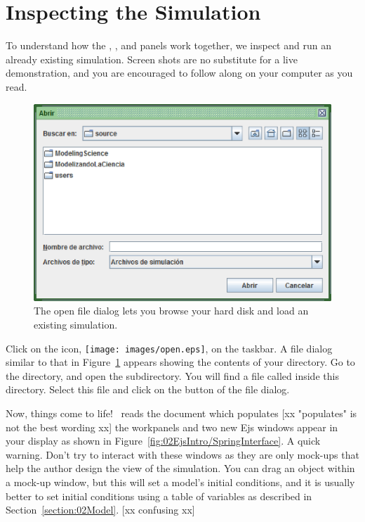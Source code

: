     \section{Inspecting the Simulation}\label{section:02Inspecting}
To understand how the , , and  panels work together, we inspect and run an
already existing simulation. Screen shots are no substitute for a live demonstration, and you are encouraged to follow along on your computer as you read.

\begin{figure}[htb]
  \centering
  \includegraphics[scale=\scale]{02EjsIntro/images/OpenDialog.eps}
  \caption{The open file dialog lets you browse your hard disk and load an existing simulation.}
  \label{fig:02EjsIntro/OpenDialog}
\end{figure}

Click on the  icon,  \texttt{[image: images/open.eps]}, on the \ejs taskbar. A file dialog
similar to that in Figure~\ref{fig:02EjsIntro/OpenDialog} appears showing the contents of your 
directory. Go to the  directory, and open the  subdirectory. You will find a
file called  inside this directory. Select this file and click on the  button of the
file dialog.

Now, things come to life! \ejs\ reads the  document which populates [xx "populates" is not the best wording xx] the workpanels and two new Ejs windows appear in your display as shown in Figure~\ref{fig:02EjsIntro/SpringInterface}. A quick warning. Don't try to interact with these windows as they are only mock-ups that help the author design the view of the
simulation. You can drag an object within a mock-up window, but this will set a model's initial conditions, and it is usually better to set initial conditions using a table of variables as described in Section~\ref{section:02Model}. [xx confusing xx]

